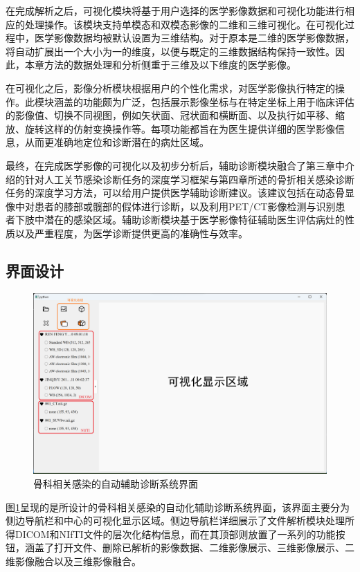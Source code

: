 在完成解析之后，可视化模块将基于用户选择的医学影像数据和可视化功能进行相应的处理操作。该模块支持单模态和双模态影像的二维和三维可视化。在可视化过程中，医学影像数据均被默认设置为三维结构。对于原本是二维的医学影像数据，将自动扩展出一个大小为一的维度，以便与既定的三维数据结构保持一致性。因此，本章方法的数据处理和分析侧重于三维及以下维度的医学影像。

在可视化之后，影像分析模块根据用户的个性化需求，对医学影像执行特定的操作。此模块涵盖的功能颇为广泛，包括展示影像坐标与在特定坐标上用于临床评估的影像值、切换不同视图，例如矢状面、冠状面和横断面、以及执行如平移、缩放、旋转这样的仿射变换操作等。每项功能都旨在为医生提供详细的医学影像信息，从而更准确地定位和诊断潜在的病灶区域。

最终，在完成医学影像的可视化以及初步分析后，辅助诊断模块融合了第三章中介绍的针对人工关节感染诊断任务的深度学习框架与第四章所述的骨折相关感染诊断任务的深度学习方法，可以给用户提供医学辅助诊断建议。该建议包括在动态骨显像中对患者的膝部或髋部的假体进行诊断，以及利用PET/CT影像检测与识别患者下肢中潜在的感染区域。辅助诊断模块基于医学影像特征辅助医生评估病灶的性质以及严重程度，为医学诊断提供更高的准确性与效率。

\subsection{界面设计}

\begin{figure}[htbp]
    \centering
    \includegraphics[width=\textwidth]{figures/chap05_preview.png}
    \caption{骨科相关感染的自动辅助诊断系统界面}
    \label{fig:chap05_preview}
\end{figure}

图\ref{fig:chap05_preview}呈现的是所设计的骨科相关感染的自动化辅助诊断系统界面，该界面主要分为侧边导航栏和中心的可视化显示区域。侧边导航栏详细展示了文件解析模块处理所得DICOM和NIfTI文件的层次化结构信息，而在其顶部则放置了一系列的功能按钮，涵盖了打开文件、删除已解析的影像数据、二维影像展示、三维影像展示、二维影像融合以及三维影像融合。

